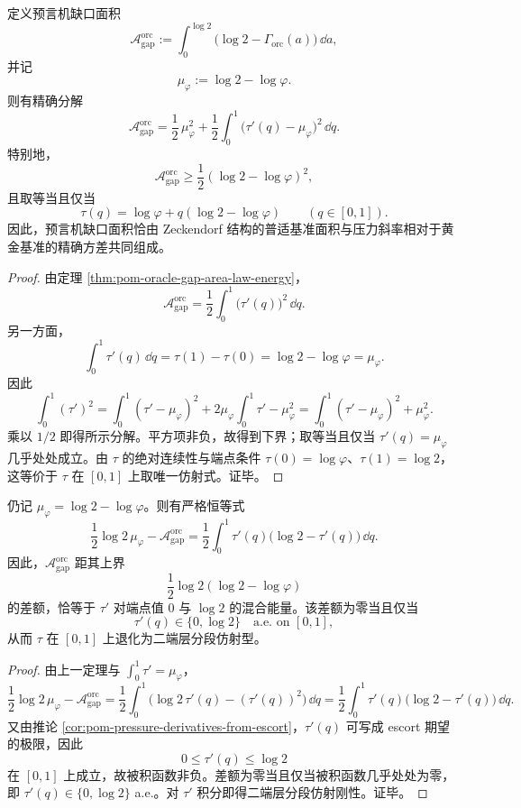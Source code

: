 \begin{theorem}\label{thm:conclusion-oracle-gap-golden-baseline-variance}
定义预言机缺口面积
\[
\mathcal A_{\mathrm{gap}}^{\mathrm{orc}}
:=
\int_0^{\log2}\bigl(\log2-\Gamma_{\mathrm{orc}}(a)\bigr)\,\dd a,
\]
并记
\[
\mu_\varphi:=\log2-\log\varphi.
\]
则有精确分解
\[
\mathcal A_{\mathrm{gap}}^{\mathrm{orc}}
=
\frac12\,\mu_\varphi^2
+
\frac12\int_0^1\bigl(\tau'(q)-\mu_\varphi\bigr)^2\,\dd q.
\]
特别地，
\[
\mathcal A_{\mathrm{gap}}^{\mathrm{orc}}
\ge
\frac12(\log2-\log\varphi)^2,
\]
且取等当且仅当
\[
\tau(q)=\log\varphi+q(\log2-\log\varphi)
\qquad (q\in[0,1]).
\]
因此，预言机缺口面积恰由 Zeckendorf 结构的普适基准面积与压力斜率相对于黄金基准的精确方差共同组成。
\end{theorem}
\begin{proof}
由定理 \ref{thm:pom-oracle-gap-area-law-energy}，
\[
\mathcal A_{\mathrm{gap}}^{\mathrm{orc}}
=
\frac12\int_0^1\bigl(\tau'(q)\bigr)^2\,\dd q.
\]
另一方面，
\[
\int_0^1\tau'(q)\,\dd q=\tau(1)-\tau(0)=\log2-\log\varphi=\mu_\varphi.
\]
因此
\[
\int_0^1(\tau')^2
=
\int_0^1(\tau'-\mu_\varphi)^2
+2\mu_\varphi\int_0^1\tau'
-\mu_\varphi^2
=
\int_0^1(\tau'-\mu_\varphi)^2+\mu_\varphi^2.
\]
乘以 \(1/2\) 即得所示分解。平方项非负，故得到下界；取等当且仅当 \(\tau'(q)=\mu_\varphi\) 几乎处处成立。由 \(\tau\) 的绝对连续性与端点条件 \(\tau(0)=\log\varphi\)、\(\tau(1)=\log2\)，这等价于 \(\tau\) 在 \([0,1]\) 上取唯一仿射式。证毕。
\end{proof}

\begin{corollary}[饱和边能量恒等式与二端层刚性]\label{cor:conclusion-oracle-gap-saturation-edge-energy}
仍记 \(\mu_\varphi=\log2-\log\varphi\)。则有严格恒等式
\[
\frac12\log2\,\mu_\varphi-\mathcal A_{\mathrm{gap}}^{\mathrm{orc}}
=
\frac12\int_0^1\tau'(q)\bigl(\log2-\tau'(q)\bigr)\,\dd q.
\]
因此，\(\mathcal A_{\mathrm{gap}}^{\mathrm{orc}}\) 距其上界
\[
\frac12\log2(\log2-\log\varphi)
\]
的差额，恰等于 \(\tau'\) 对端点值 \(0\) 与 \(\log2\) 的混合能量。该差额为零当且仅当
\[
\tau'(q)\in\{0,\log2\}
\quad\text{a.e. on }[0,1],
\]
从而 \(\tau\) 在 \([0,1]\) 上退化为二端层分段仿射型。
\end{corollary}
\begin{proof}
由上一定理与 \(\int_0^1\tau'=\mu_\varphi\)，
\[
\frac12\log2\,\mu_\varphi-\mathcal A_{\mathrm{gap}}^{\mathrm{orc}}
=
\frac12\int_0^1\bigl(\log2\,\tau'(q)-(\tau'(q))^2\bigr)\,\dd q
=
\frac12\int_0^1\tau'(q)\bigl(\log2-\tau'(q)\bigr)\,\dd q.
\]
又由推论 \ref{cor:pom-pressure-derivatives-from-escort}，\(\tau'(q)\) 可写成 escort 期望的极限，因此
\[
0\le \tau'(q)\le \log2
\]
在 \([0,1]\) 上成立，故被积函数非负。差额为零当且仅当被积函数几乎处处为零，即 \(\tau'(q)\in\{0,\log2\}\) a.e.。对 \(\tau'\) 积分即得二端层分段仿射刚性。证毕。
\end{proof}

